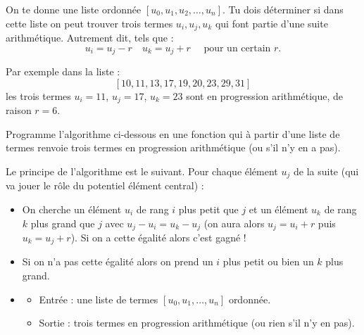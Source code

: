 \documentclass[11pt,class=report,crop=false]{standalone}
\begin{document}


\begin{activite}


On te donne une liste ordonnée $[u_0,u_1,u_2,\ldots,u_n]$. Tu dois déterminer si dans cette liste on peut trouver trois termes $u_i,u_j,u_k$ qui font partie d'une suite arithmétique. Autrement dit, tels que :
$$u_i = u_j - r \quad u_k = u_j+r \quad \text{ pour un certain } r.$$



Par exemple dans la liste :
$$[10,11,13,17,19,20,23,29,31]$$
les trois termes $u_i = 11$, $u_j=17$, $u_k=23$ sont en progression arithmétique, de raison $r = 6$.

Programme l'algorithme ci-dessous en une fonction 
qui à partir d'une liste de termes  renvoie trois termes en progression arithmétique (ou  s'il n'y en a pas).


\bigskip

Le principe de l'algorithme est le suivant. Pour chaque élément $u_j$ de la suite (qui va jouer le rôle du potentiel élément central) :
\begin{itemize}
  
  \item On cherche un élément $u_i$ de rang $i$ plus petit que $j$ et un élément $u_k$ de rang $k$ plus grand que $j$ avec $u_j-u_i = u_k-u_j$ (on aura alors $u_j = u_i + r$ puis $u_k = u_j + r$).  Si on a cette égalité alors c'est gagné !
  
  \item Si on n'a pas cette égalité alors on prend un $i$ plus petit ou bien un $k$ plus grand.
  
\end{itemize} 

\bigskip

\begin{algorithme}
  \sauteligne 
 \begin{itemize}
   \item
   \begin{itemize}
     \item Entrée : une liste de termes $[u_0,u_1,\ldots,u_n]$ ordonnée.
     \item Sortie : trois termes en progression arithmétique (ou rien s'il n'y en pas).
   \end{itemize}


\end{itemize}
\end{algorithme}
\end{activite}
\end{document}
